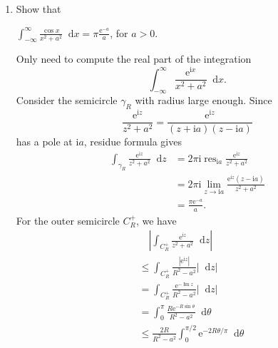 \documentclass[11pt]{report}
\theoremstyle{mythm}
\let\oldendproof\endproof
\renewenvironment{proof}[1][\proofname]{%
  \oldproof[\normalfont \bfseries #1]%
}{\oldendproof}
\renewcommand*{\proofname}{Proof}
\theoremstyle{myans}
\newtheorem*{answer}{Answer}
\newcommand{\mi}{\mathrm{i}}
\newcommand{\me}{\mathrm{e}}
\newcommand{\dd}{\mathop{}\!\mathrm{d}}
\renewcommand{\Im}{\operatorname{Im}}
\DeclareMathOperator{\res}{res}
\begin{document}
\begin{enumerate}
\begin{answer}
\begin{align*}
    \end{align*}
    Similarly, we have
    \[ \res_{\omega^3} \frac1{z^4+1} = \frac 1{4\omega}. \]
    Therefore,
    \begin{align*}
      &\quad 2\pi \mi \left(\res_{\omega} \frac 1{z^4+1}
      + \res_{\omega^3} \frac 1{z^4+1} \right)\\
      &= \frac {\pi}{2} \mi (\omega^{-1} + \omega^{-3})\\
      &= \frac{\sqrt 2}{2} \pi.
    \end{align*}
    For the outer semicircle $C_R^+$, we have
    \[ \left| \int_{C_R^+} \frac{\dd z}{z^4+1} \right| = O\left( R \cdot \frac 1{R^4} \right) \to 0. \]
    So we have
    \[ \int_{-\infty}^{\infty} \frac{\dd x}{x^4+1} = \frac{\sqrt 2}{2} \pi. \]
  \end{answer}
  \item Show that
  \begin{center}
    $\displaystyle \int_{-\infty}^\infty \frac{\cos x}{x^2+a^2} \dd x = \pi \frac{\me^{-a}}{a}$,
    \quad for $a>0$.
  \end{center}
  \begin{proof}
    Only need to compute the real part of the integration
    \[ \int_{-\infty}^\infty \frac{\me^{\mi x}}{x^2+a^2} \dd x. \]
    Consider the semicircle $\gamma_R$ with radius large enough. Since
    \[ \frac{\me^{\mi z}}{z^2+a^2} = \frac{\me^{\mi z}}{(z+\mi a)(z-\mi a)} \]
    has a pole at $\mi a$, residue formula gives
    \begin{align*}
      \int_{\gamma_R} \frac{\me^{\mi z}}{z^2+a^2}\dd z &= 2\pi \mi \res_{\mi a} \frac{\me^{\mi z}}{z^2+a^2}\\
      &= 2\pi \mi \lim_{z\to \mi a} \frac{\me^{\mi z}(z - \mi a)}{z^2+a^2}\\
      &= \frac{\pi \me^{-a}}{a}.
    \end{align*}
    For the outer semicircle $C_R^+$, we have
    \begin{align*}
      &\quad \left| \int_{C_R^+} \frac{\me^{\mi z}}{z^2+a^2}\dd z \right|\\
      & \leq \int_{C_R^+} \frac{|\me^{\mi z}|}{R^2 - a^2} \left|\dd z\right|\\
      & = \int_{C_R^+} \frac{\me^{-\Im z}}{R^2 - a^2} \left|\dd z\right|\\
      & = \int_0^\pi \frac{R\me^{-R\sin \theta}}{R^2 - a^2} \dd \theta\\
      &\leq \frac{2R}{R^2-a^2} \int_0^{\pi/2} \me^{-2R\theta/\pi} \dd \theta\\

\end{align*}
\end{proof}
\end{enumerate}
\end{document}
